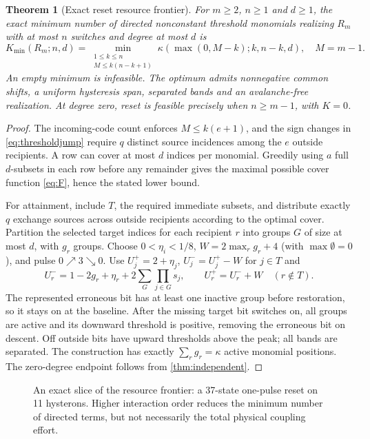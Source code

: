 \documentclass[12pt,letterpaper]{article}
\newtheorem{theorem}{Theorem}[section]
\theoremstyle{definition}\newtheorem{definition}[theorem]{Definition}
\theoremstyle{remark}\newtheorem{remark}[theorem]{Remark}
\newcommand{\Kmin}{K_{\min}}
\begin{document}
\begin{theorem}[Exact reset resource frontier]\label{thm:frontier}
For $m\ge2$, $n\ge1$ and $d\ge1$, the exact minimum number of directed nonconstant threshold monomials realizing $R_m$ with at most $n$ switches and degree at most $d$ is
\begin{equation}\label{eq:frontier}
\boxed{\Kmin(R_m;n,d)=\min_{\substack{1\le k\le n\\M\le k(n-k+1)}}\kappa(\max(0,M-k);k,n-k,d),}\quad M=m-1.
\end{equation}
An empty minimum is infeasible. The optimum admits nonnegative common shifts, a uniform hysteresis span, separated bands and an avalanche-free realization. At degree zero, reset is feasible precisely when $n\ge m-1$, with $K=0$.
\end{theorem}
\begin{proof}
The incoming-code count enforces $M\le k(e+1)$, and the sign changes in \eqref{eq:thresholdjump} require $q$ distinct source incidences among the $e$ outside recipients. A row can cover at most $d$ indices per monomial. Greedily using $a$ full $d$-subsets in each row before any remainder gives the maximal possible cover function \eqref{eq:F}, hence the stated lower bound.

For attainment, include $T$, the required immediate subsets, and distribute exactly $q$ exchange sources across outside recipients according to the optimal cover. Partition the selected target indices for each recipient $r$ into groups $G$ of size at most $d$, with $g_r$ groups. Choose $0<\eta_i<1/8$, $W=2\max_r g_r+4$ (with $\max\emptyset=0$), and pulse $0\nearrow3\searrow0$. Use $U_j^+=2+\eta_j$, $U_j^-=U_j^+-W$ for $j\in T$ and
\begin{equation}\label{eq:frontconstruct}
 U_r^-=1-2g_r+\eta_r+2\sum_G\prod_{j\in G}s_j,\qquad U_r^+=U_r^-+W \quad(r\notin T).
\end{equation}
The represented erroneous bit has at least one inactive group before restoration, so it stays on at the baseline. After the missing target bit switches on, all groups are active and its downward threshold is positive, removing the erroneous bit on descent. Off outside bits have upward thresholds above the peak; all bands are separated. The construction has exactly $\sum_rg_r=\kappa$ active monomial positions. The zero-degree endpoint follows from \cref{thm:independent}.
\end{proof}

\begin{figure}[ht]
\centering\resizebox{\linewidth}{!}{}
\caption{An exact slice of the resource frontier: a 37-state one-pulse reset on 11 hysterons. Higher interaction order reduces the minimum number of directed terms, but not necessarily the total physical coupling effort.}
\label{fig:frontier}
\end{figure}
\end{document}

